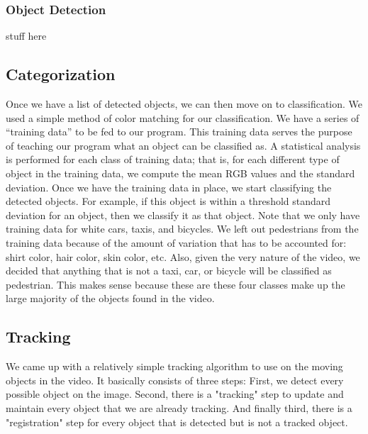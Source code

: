 \documentclass[a4paper, 10pt, conference]{ieeeconf}      %
\begin{document}
\subsubsection{Object Detection}



stuff here




\subsection{Categorization}






Once we have a list of detected objects, we can then move on to classification. We used a simple method of color matching for our classification. We have a series of “training data” to be fed to our program. This training data serves the purpose of teaching our program what an object can be classified as. A statistical analysis is performed for each class of training data; that is, for each different type of object in the training data, we compute the mean RGB values and the standard deviation. Once we have the training data in place, we start classifying the detected objects. For example, if this object is within a threshold standard deviation for an object, then we classify it as that object. Note that we only have training data for white cars, taxis, and bicycles. We left out pedestrians from the training data because of the amount of variation that has to be accounted for: shirt color, hair color, skin color, etc. Also, given the very nature of the video, we decided that anything that is not a taxi, car, or bicycle will be classified as pedestrian. This makes sense because these are these four classes make up the large majority of the objects found in the video. \newline





\subsection{Tracking}

We came up with a relatively simple tracking algorithm to use on the moving objects in the video. It basically consists of three steps: First, we detect every possible object on the image. Second, there is a "tracking" step to update and maintain every object that we are already tracking. And finally third, there is a "registration" step for every object that is detected but is not a tracked object. 
\newline
\end{document}
